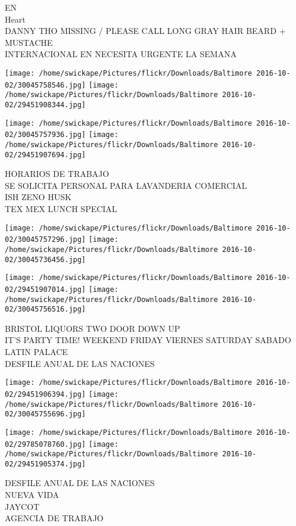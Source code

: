 \documentclass[10pt,letterpaper]{article}
\begin{document}
EN\\
Heart\\
DANNY THO MISSING / PLEASE CALL LONG GRAY HAIR BEARD + MUSTACHE\\
INTERNACIONAL EN NECESITA URGENTE LA SEMANA
\pagebreak

\texttt{[image: /home/swickape/Pictures/flickr/Downloads/Baltimore 2016-10-02/30045758546.jpg]}
\texttt{[image: /home/swickape/Pictures/flickr/Downloads/Baltimore 2016-10-02/29451908344.jpg]}

\texttt{[image: /home/swickape/Pictures/flickr/Downloads/Baltimore 2016-10-02/30045757936.jpg]}
\texttt{[image: /home/swickape/Pictures/flickr/Downloads/Baltimore 2016-10-02/29451907694.jpg]}

HORARIOS DE TRABAJO\\
SE SOLICITA PERSONAL PARA LAVANDERIA COMERCIAL\\
ISH ZENO HUSK\\
TEX MEX LUNCH SPECIAL
\pagebreak

\texttt{[image: /home/swickape/Pictures/flickr/Downloads/Baltimore 2016-10-02/30045757296.jpg]}
\texttt{[image: /home/swickape/Pictures/flickr/Downloads/Baltimore 2016-10-02/30045736456.jpg]}

\texttt{[image: /home/swickape/Pictures/flickr/Downloads/Baltimore 2016-10-02/29451907014.jpg]}
\texttt{[image: /home/swickape/Pictures/flickr/Downloads/Baltimore 2016-10-02/30045756516.jpg]}

BRISTOL LIQUORS TWO DOOR DOWN UP\\
IT'S PARTY TIME!  WEEKEND FRIDAY VIERNES SATURDAY SABADO\\
LATIN PALACE\\
DESFILE ANUAL DE LAS NACIONES
\pagebreak

\texttt{[image: /home/swickape/Pictures/flickr/Downloads/Baltimore 2016-10-02/29451906394.jpg]}
\texttt{[image: /home/swickape/Pictures/flickr/Downloads/Baltimore 2016-10-02/30045755696.jpg]}

\texttt{[image: /home/swickape/Pictures/flickr/Downloads/Baltimore 2016-10-02/29785078760.jpg]}
\texttt{[image: /home/swickape/Pictures/flickr/Downloads/Baltimore 2016-10-02/29451905374.jpg]}

DESFILE ANUAL DE LAS NACIONES\\
NUEVA VIDA\\
JAYCOT\\
AGENCIA DE TRABAJO
\pagebreak
\end{document}
